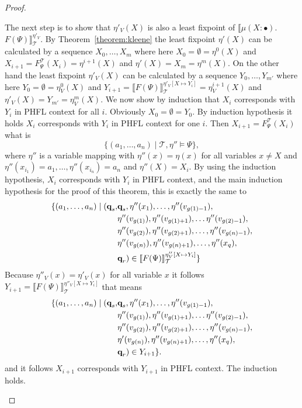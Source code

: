 \begin{proof}
\begin{compactitem}
        The next step is to show that $\eta'_V(X)$ is also a least fixpoint of $\llbracket
         \mu(X\colon \bullet).\,$ $F(\Psi) \rrbracket^{\eta'_V}_\mathcal{T}$. By Theorem~\ref{theorem:kleene} the least fixpoint $\eta'(X)$ can be calculated by a sequence $X_0, \dots, X_m
         $ where here $X_0 = \emptyset = \eta^0(X)$ and $X_{i+1} = F_\Psi^\mathcal{T}(X_i) = \eta^{i+1}(X)$ and $\eta'(X) = X_m = \eta^m(X)$. On the other hand the least fixpoint $\eta'_V(X)$ can be calculated by a sequence 
         $Y_0, \dots, Y_{m'}$ where here $Y_0 = \emptyset = \eta^0_V(X)$ and $Y_{i+1} = \llbracket F(\Psi)\rrbracket_\mathcal{T}^{\eta'_V[X \mapsto Y_i]} = \eta^{i+1}_V(X)$ and $\eta'_V(X) = Y_{m'} = \eta^m_V(X)$. We now show by induction that $X_i$ corresponds with $Y_i$ in PHFL context for all $i$. Obviously $X_0 = \emptyset = Y_0$. By induction hypothesis it holds $X_i$ corresponds with $Y_i$ in PHFL context for 
         one $i$. Then $X_{i+1} = F_\Psi^\mathcal{T}(X_i)$ what is
         \[\{(a_1, \dots, a_n) \mid \mathcal{T}, \eta'' \models \Psi\},\] 
         where $\eta''$ is a variable mapping with $\eta''(x) = \eta(x)$ for all variables $x \neq X$ and $\eta''(x_{i_1}) = a_1, \dots,  \eta''(x_{i_n}) = a_n$ and $\eta''(X) = X_i$. 
         By using the induction hypothesis, $X_i$ corresponds with $Y_i$ in PHFL context, and the main induction hypothesis for the proof of this theorem, this is exactly the same to
                 \begin{align*}
                 \{(a_1, \dots, a_n) \mid 
        (\emph{q}_s, &\emph{q}_s, \eta''(x_1), \dots, \eta''(v_{g(1)-1}),\\& \eta''(v_{g(1)}), \eta''(v_{g(1)+1}), \dots \eta''(v_{g(2)-1}),\\& \eta''
            (v_{g(2)}), \eta''(v_{g(2)+1}), \dots, \eta''(v_{g(n)-1}), \\&\eta''(v_{g(n)}), \eta''(v_{g(n)+1}), \dots, \eta''
            (x_q), \\& \emph{q}_r) \in \llbracket
        F(\Psi) \rrbracket^{\eta''_V[X\mapsto Y_i]}_\mathcal{T}\}
        \end{align*}
		Because $\eta''_V(x) = \eta'_V(x)$ for all variable $x$ it follows $Y_{i+1} = \llbracket F(\Psi)\rrbracket_\mathcal{T}^{\eta''_V[X \mapsto Y_i]}$ that means        
        \begin{align*}
                 \{(a_1, \dots, a_n) \mid 
        (\emph{q}_s, &\emph{q}_s, \eta''(x_1), \dots, \eta''(v_{g(1)-1}),\\& \eta''(v_{g(1)}), \eta''(v_{g(1)+1}), \dots \eta''(v_{g(2)-1}),\\& \eta''
            (v_{g(2)}), \eta''(v_{g(2)+1}), \dots, \eta''(v_{g(n)-1}), \\&\eta'(v_{g(n)}), \eta''(v_{g(n)+1}), \dots, \eta''
            (x_q), \\& \emph{q}_r) \in Y_{i+1}\}.
        \end{align*}
         and it follows $X_{i+1}$ corresponds with $Y_{i+1}$ in PHFL context. The induction holds.
        

\end{compactitem}
\end{proof}
